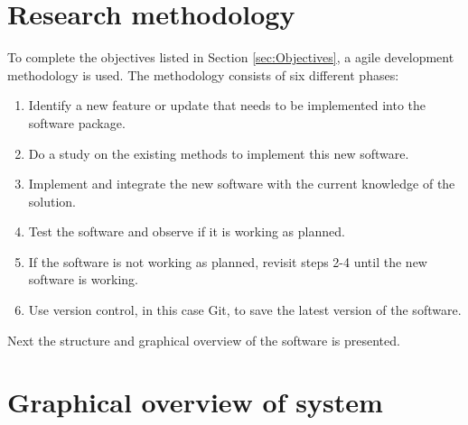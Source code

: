 \section{Research methodology}

To complete the objectives listed in Section \ref{sec:Objectives}, a agile development methodology is used. The methodology consists of six different phases:
\begin{enumerate}
\item Identify a new feature or update that needs to be implemented into the software package.
\item Do a study on the existing methods to implement this new software.
\item Implement and integrate the new software with the current knowledge of the solution.
\item Test the software and observe if it is working as planned.
\item If the software is not working as planned, revisit steps 2-4 until the new software is working.
\item Use version control, in this case Git, to save the latest version of the software.
\end{enumerate}


Next the structure and graphical overview of the software is presented.

\section{Graphical overview of system}

